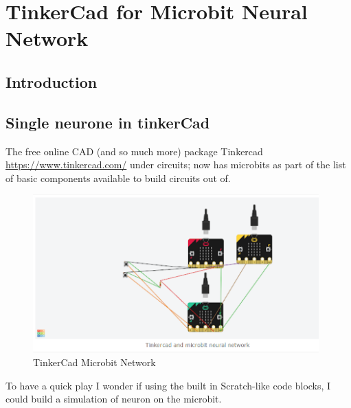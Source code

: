 \chapter{TinkerCad for Microbit Neural Network}
\section{Introduction}
\section{Single neurone in tinkerCad}
The free online CAD (and so much more) package Tinkercad \url{https://www.tinkercad.com/} under circuits; now has microbits as part of the list of basic components available to build circuits out of.
\begin{figure}
    \centering
    \includegraphics[width=11cm]{chapters/chAi1/figures/Tinkercadann1.png}
    \caption{TinkerCad Microbit Network}
    \label{fig:tinkercad_neural_microbit_network}
\end{figure}
To have a quick play I wonder if using the built in Scratch-like code blocks, I could build a simulation of neuron on the microbit.

